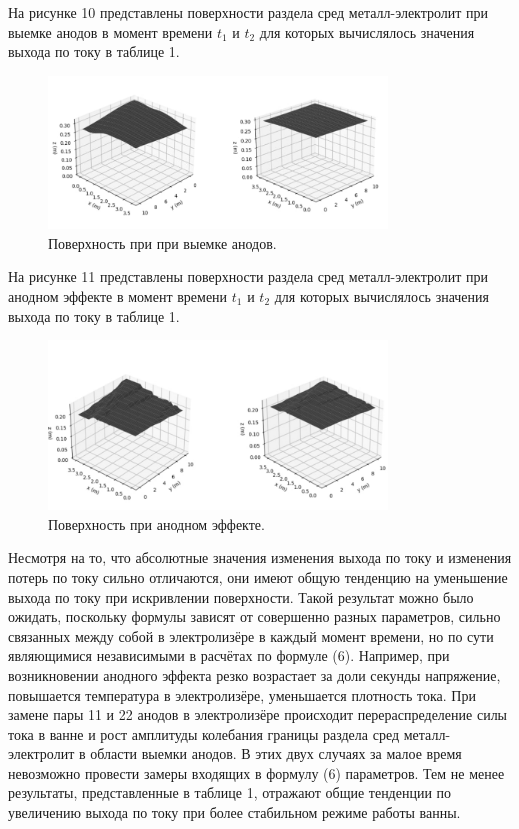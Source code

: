 \documentclass{article}
\begin{document}
На рисунке 10 представлены поверхности раздела сред металл-электролит при выемке анодов в момент времени $t_1$ и $t_2$ для которых вычислялось значения выхода по току в таблице 1.

\begin{figure}[h!]
    \centering
    \includegraphics[width=90mm]{Выемка анодов поверхность.png}
    \caption{Поверхность при при выемке анодов.}
    \label{fig:} 
\end{figure}

На рисунке 11 представлены поверхности раздела сред металл-электролит при анодном эффекте в момент времени $t_1$ и $t_2$ для которых вычислялось значения выхода по току в таблице 1.

\begin{figure}[h!]
    \centering
    \includegraphics[width=90mm]{Анодный эффект поверхность.png}
    \caption{Поверхность при анодном эффекте.}
    \label{fig:} 
\end{figure}

Несмотря на то, что абсолютные значения изменения выхода по току и изменения потерь по току сильно отличаются, они имеют общую тенденцию на уменьшение выхода по току при искривлении поверхности. Такой результат можно было ожидать, поскольку формулы зависят от совершенно разных параметров, сильно связанных между собой в электролизёре в каждый момент времени, но по сути являющимися независимыми в расчётах по формуле (6). Например, при возникновении анодного эффекта резко возрастает за доли секунды напряжение, повышается температура в электролизёре, уменьшается плотность тока. При замене пары 11 и 22 анодов в электролизёре происходит перераспределение силы тока в ванне и рост амплитуды колебания границы раздела сред металл-электролит в области выемки анодов. В этих двух случаях за малое время невозможно провести замеры входящих в формулу (6) параметров. Тем не менее результаты, представленные в таблице 1, отражают общие тенденции по увеличению выхода по току при более стабильном режиме работы ванны.
\end{document}

